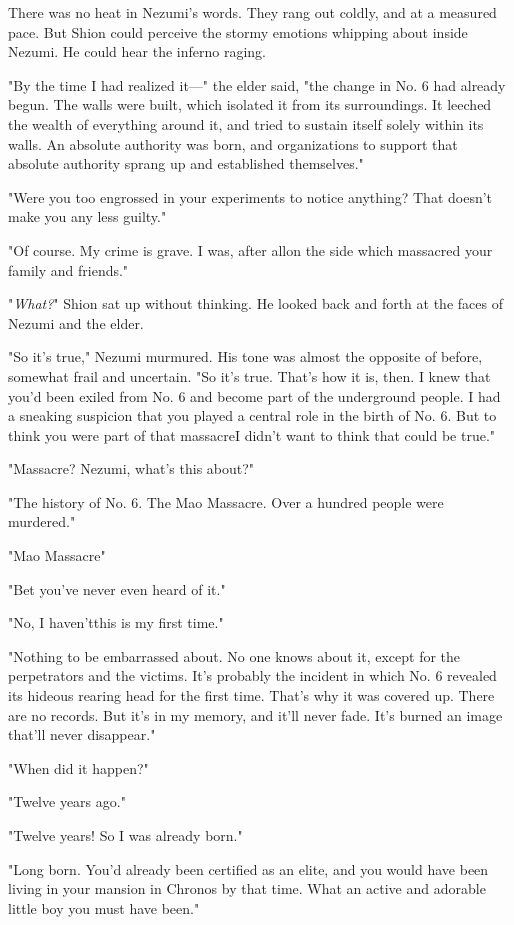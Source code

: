 There was no heat in Nezumi's words. They rang out coldly, and at a
measured pace. But Shion could perceive the stormy emotions whipping
about inside Nezumi. He could hear the inferno raging.

"By the time I had realized it---" the elder said, "the change in No. 6
had already begun. The walls were built, which isolated it from its
surroundings. It leeched the wealth of everything around it, and tried
to sustain itself solely within its walls. An absolute authority was
born, and organizations to support that absolute authority sprang up and
established themselves."

"Were you too engrossed in your experiments to notice anything? That
doesn't make you any less guilty."

"Of course. My crime is grave. I was, after all\el on the side which
massacred your family and friends."

"\emph{What?}" Shion sat up without thinking. He looked back and forth at the
faces of Nezumi and the elder.

"So it's true," Nezumi murmured. His tone was almost the opposite of
before, somewhat frail and uncertain. "So it's true. That's how it is,
then. I knew that you'd been exiled from No. 6 and become part of the
underground people. I had a sneaking suspicion that you played a central
role in the birth of No. 6. But to think you were part of that
massacre\el I didn't want to think that could be true."

"Massacre? Nezumi, what's this about?"

"The history of No. 6. The Mao Massacre. Over a hundred people were
murdered."

"Mao Massacre\el "

"Bet you've never even heard of it."

"No, I haven't\el this is my first time."

"Nothing to be embarrassed about. No one knows about it, except for the
perpetrators and the victims. It's probably the incident in which No. 6
revealed its hideous rearing head for the first time. That's why it was
covered up. There are no records. But it's in my memory, and it'll never
fade. It's burned an image that'll never disappear."

"When did it happen?"

"Twelve years ago."

"Twelve years! So I was already born."

"Long born. You'd already been certified as an elite, and you would have
been living in your mansion in Chronos by that time. What an active and
adorable little boy you must have been."

